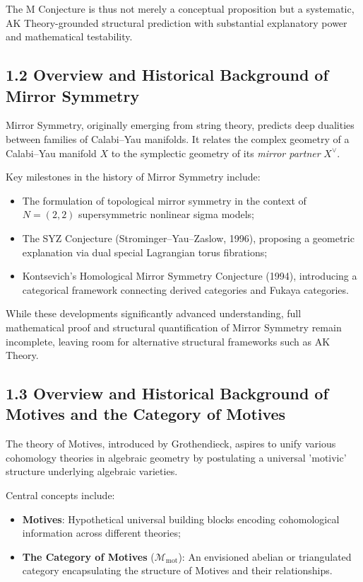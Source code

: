 \documentclass[11pt]{article}
\begin{document}
The M Conjecture is thus not merely a conceptual proposition but a systematic, AK Theory-grounded structural prediction with substantial explanatory power and mathematical testability.

\subsection{1.2 Overview and Historical Background of Mirror Symmetry}

Mirror Symmetry, originally emerging from string theory, predicts deep dualities between families of Calabi--Yau manifolds. It relates the complex geometry of a Calabi--Yau manifold $X$ to the symplectic geometry of its \textit{mirror partner} $X^{\vee}$.

Key milestones in the history of Mirror Symmetry include:

\begin{itemize}
    \item The formulation of topological mirror symmetry in the context of $N=(2,2)$ supersymmetric nonlinear sigma models;
    \item The SYZ Conjecture (Strominger--Yau--Zaslow, 1996), proposing a geometric explanation via dual special Lagrangian torus fibrations;
    \item Kontsevich's Homological Mirror Symmetry Conjecture (1994), introducing a categorical framework connecting derived categories and Fukaya categories.
\end{itemize}

While these developments significantly advanced understanding, full mathematical proof and structural quantification of Mirror Symmetry remain incomplete, leaving room for alternative structural frameworks such as AK Theory.

\subsection{1.3 Overview and Historical Background of Motives and the Category of Motives}

The theory of Motives, introduced by Grothendieck, aspires to unify various cohomology theories in algebraic geometry by postulating a universal 'motivic' structure underlying algebraic varieties.

Central concepts include:

\begin{itemize}
    \item \textbf{Motives}: Hypothetical universal building blocks encoding cohomological information across different theories;
    \item \textbf{The Category of Motives} ($\mathcal{M}_{\mathrm{mot}}$): An envisioned abelian or triangulated category encapsulating the structure of Motives and their relationships.
\end{itemize}
\end{document}
